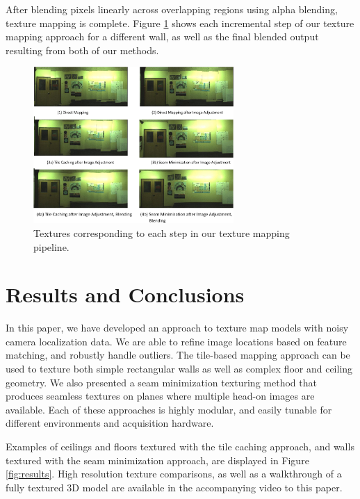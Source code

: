\documentclass[10pt,twocolumn,letterpaper]{article}
\begin{document}
After blending pixels linearly across overlapping regions using alpha
blending, texture mapping is complete. Figure
\ref{fig:pipelineimages} shows each incremental step of our texture
mapping approach for a different wall, as well as the final blended output resulting from
both of our methods.

\begin{figure}
  \centering
  \includegraphics[width=3in]{pipelineimages.pdf}
  \caption{Textures corresponding to each step in our texture mapping
    pipeline.}
  \label{fig:pipelineimages}
\end{figure}


\section{Results and Conclusions}
\label{sec:resultsAndConclusions}
In this paper, we have developed an approach to texture map models
with noisy camera localization data. We are able to refine image
locations based on feature matching, and robustly handle outliers. The tile-based mapping approach can be used to texture both simple rectangular walls as
well as complex floor and ceiling geometry. We also presented a seam minimization texturing method that produces seamless textures on planes where
multiple head-on images are available. Each of these approaches is
highly modular, and easily tunable for different environments and
acquisition hardware.

Examples of ceilings and floors textured with the tile caching approach, and walls
textured with the seam minimization approach, are displayed in Figure
\ref{fig:results}. High resolution texture comparisons, as well as a
walkthrough of a fully textured 3D model are available in the
accompanying video to this paper.
\end{document}
